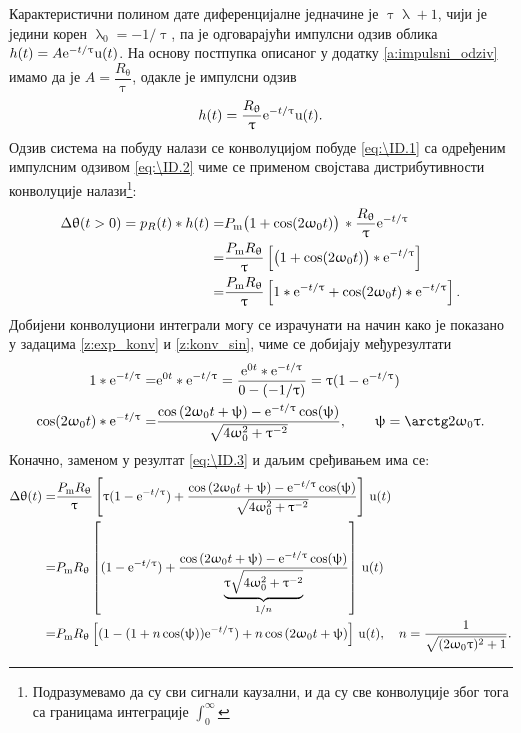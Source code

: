Карактеристични полином дате диференцијалне једначине је $\uptau \uplambda + 1$, чији је једини корен 
$\uplambda_0 = -1/\uptau$, па је одговарајући импулсни одзив облика $h(t) = A {\rm e}^{-t/\uptau} {\rm u}(t)$. На основу 
постпупка описаног у додатку \ref{a:impulsni_odziv} имамо да је 
$A = \dfrac{R_{\uptheta}}{\uptau}$, одакле је импулсни одзив 
\begin{equation}
h(t) = \dfrac{R_{\uptheta}}{\uptau} \ee^{-t/\uptau} \uu(t). \label{eq:\ID.2}
\end{equation}
Одзив система на побуду налази се конволуцијом побуде \eqref{eq:\ID.1} са одређеним импулсним одзивом \eqref{eq:\ID.2}
чиме се применом својстава дистрибутивности конволуције налази\footnote{Подразумевамо да су сви сигнали каузални, и 
да су све конволуције због тога са границама интеграције $\int_{0}^{\infty}$}:
\begin{align}
    \Delta\uptheta(t > 0) = p_{R}(t) \ast h(t) =& 
    P_{\rm m} \bigl(1 + \cos(2\upomega_0 t) \bigr) \, \ast \dfrac{R_{\uptheta}}{\uptau} \ee^{-t/\uptau}  \\
    =& \dfrac{P_{\rm m} R_{\uptheta}}{\uptau} 
    \left[ \bigl(1 + \cos(2\upomega_0 t) \bigr)\ast \ee^{-t/\uptau} \right] \\
    =& \dfrac{P_{\rm m} R_{\uptheta}}{\uptau}
    \left[ 1 \ast \ee^{-t/\uptau} + \cos(2\upomega_0 t) \ast \ee^{-t/\uptau} \right]. \label{eq:\ID.3}
\end{align}
Добијени конволуциони интеграли могу се израчунати на начин како је показано у задацима 
\ref{z:exp_konv} и \ref{z:konv_sin}, чиме се добијају међурезултати
\begin{align}
    1 \ast \ee^{-t/\uptau}  =& \ee^{0t} \ast \ee^{-t/\uptau} =   
    \dfrac{\ee^{0t} \ast \ee^{-t/\uptau}}{ 0 - (-1/\uptau) } = \uptau (1 - \ee^{-t/\uptau}) \\
    \cos(2\upomega_0 t) \ast \ee^{-t/\uptau} =&
    \dfrac{
        \cos\left( 2\upomega_0 t +  \uppsi \right)
        - \ee^{-t/\uptau} \cos(\uppsi)
        }{ \sqrt{ 4\upomega_0^2 + \uptau^{-2} } }, \qquad \uppsi = \arctg 2\upomega_0\uptau.
\end{align}
Коначно, заменом у резултат \eqref{eq:\ID.3} и даљим сређивањем има се:
\begin{align}
    \Delta\uptheta(t) =& \dfrac{P_{\rm m} R_{\uptheta}}{\uptau}
    \left[ \uptau (1 - {\rm e}^{-t/\uptau}) +  
    \dfrac{
        \cos\left( 2\upomega_0 t +  \uppsi \right)
        - {\rm e}^{-t/\uptau} \cos(\uppsi)
        }{ \sqrt{ 4\upomega_0^2 + \uptau^{-2} } } 
    \right] \, {\rm u}(t) \\
    =&
    {P_{\rm m} R_{\uptheta}}
    \left[ (1 - {\rm e}^{-t/\uptau}) +
    \dfrac{
        \cos\left( 2\upomega_0 t +  \uppsi \right)
        - {\rm e}^{-t/\uptau} \cos(\uppsi)
        }{ \underbrace{\uptau  \sqrt{ 4\upomega_0^2 + \uptau^{-2}} }_{1/n} } 
    \right] \, {\rm u}(t) \\
    =& 
    {P_{\rm m} R_{\uptheta}}
    \left[ (1 - (1 + n\cos(\uppsi)) {\rm e}^{-t/\uptau} )
        + n \cos\left( 2\upomega_0 t +  \uppsi \right)
    \right] \, {\rm u}(t), \quad n = \dfrac{1}{ \sqrt{ (2\upomega_0 \uptau )^2 + 1 }}.
\end{align}
